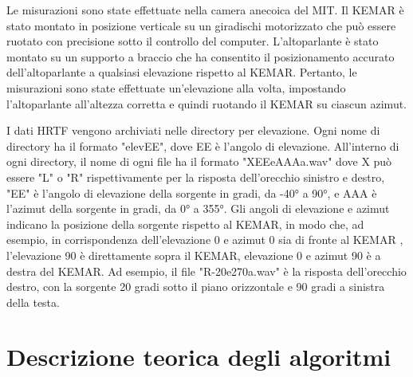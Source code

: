 \documentclass[12pt,a4paper,titlepage]{article}
\begin{document}
Le misurazioni sono state effettuate nella camera anecoica del MIT. Il KEMAR è stato montato in posizione verticale su un giradischi motorizzato che può essere ruotato con precisione sotto il controllo del computer. L'altoparlante è stato montato su un supporto a braccio che ha consentito il posizionamento accurato dell'altoparlante a qualsiasi elevazione rispetto al KEMAR. Pertanto, le misurazioni sono state effettuate un'elevazione alla volta, impostando l'altoparlante all'altezza corretta e quindi ruotando il KEMAR su ciascun azimut.

I dati HRTF vengono archiviati nelle directory per elevazione. Ogni nome di directory ha il formato "elevEE", dove EE è l'angolo di elevazione. All'interno di ogni directory, il nome di ogni file ha il formato "XEEeAAAa.wav" dove X può essere "L" o "R" rispettivamente per la risposta dell'orecchio sinistro e destro, "EE" è l'angolo di elevazione della sorgente in gradi, da -40° a 90°, e AAA è l'azimut della sorgente in gradi, da 0° a 355°. Gli angoli di elevazione e azimut indicano la posizione della sorgente rispetto al KEMAR, in modo che, ad esempio, in corrispondenza dell'elevazione 0 e azimut 0 sia di fronte al KEMAR , l'elevazione 90 è direttamente sopra il KEMAR, elevazione 0 e azimut 90 è a destra del KEMAR. Ad esempio, il file "R-20e270a.wav" è la risposta dell'orecchio destro, con la sorgente 20 gradi sotto il piano orizzontale e 90 gradi a sinistra della testa.
\clearpage
\section{Descrizione teorica degli algoritmi}
\label{sec:descrizione_teorica}
\end{document}
